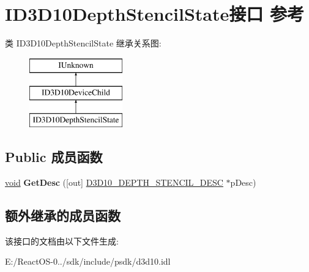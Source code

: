 \hypertarget{interface_i_d3_d10_depth_stencil_state}{}\section{I\+D3\+D10\+Depth\+Stencil\+State接口 参考}
\label{interface_i_d3_d10_depth_stencil_state}
类 I\+D3\+D10\+Depth\+Stencil\+State 继承关系图\+:\begin{figure}[H]
\begin{center}
\leavevmode
\includegraphics[height=3.000000cm]{interface_i_d3_d10_depth_stencil_state}
\end{center}
\end{figure}
\subsection*{Public 成员函数}
\begin{DoxyCompactItemize}
\item 
\mbox{\label{interface_i_d3_d10_depth_stencil_state_ad41177f45ea23d9a3492279c0c8ccfee}} 
\hyperlink{interfacevoid}{void} {\bfseries Get\+Desc} (\mbox{[}out\mbox{]} \hyperlink{struct_d3_d10___d_e_p_t_h___s_t_e_n_c_i_l___d_e_s_c}{D3\+D10\+\_\+\+D\+E\+P\+T\+H\+\_\+\+S\+T\+E\+N\+C\+I\+L\+\_\+\+D\+E\+SC} $\ast$p\+Desc)
\end{DoxyCompactItemize}
\subsection*{额外继承的成员函数}


该接口的文档由以下文件生成\+:\begin{DoxyCompactItemize}
\item 
E\+:/\+React\+O\+S-\/0../sdk/include/psdk/d3d10.\+idl\end{DoxyCompactItemize}
